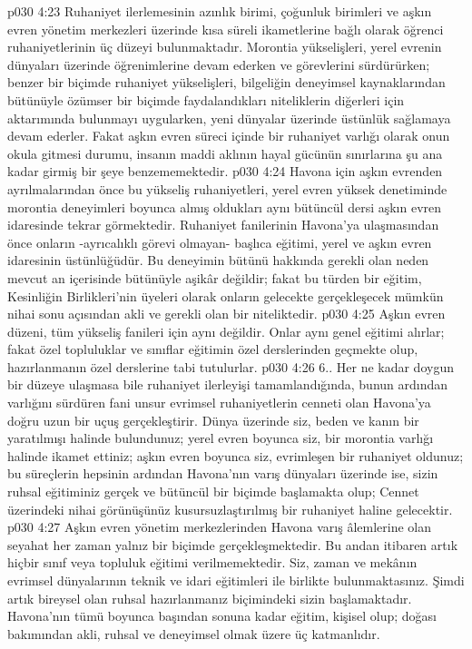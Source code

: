 \vs p030 4:23 Ruhaniyet ilerlemesinin azınlık birimi, çoğunluk birimleri ve aşkın evren yönetim merkezleri üzerinde kısa süreli ikametlerine bağlı olarak öğrenci ruhaniyetlerinin üç düzeyi bulunmaktadır. Morontia yükselişleri, yerel evrenin dünyaları üzerinde öğrenimlerine devam ederken ve görevlerini sürdürürken; benzer bir biçimde ruhaniyet yükselişleri, bilgeliğin deneyimsel kaynaklarından bütünüyle özümser bir biçimde faydalandıkları niteliklerin diğerleri için aktarımında bulunmayı uygularken, yeni dünyalar üzerinde üstünlük sağlamaya devam ederler. Fakat aşkın evren süreci içinde bir ruhaniyet varlığı olarak onun okula gitmesi durumu, insanın maddi aklının hayal gücünün sınırlarına şu ana kadar girmiş bir şeye benzememektedir.
\vs p030 4:24 Havona için aşkın evrenden ayrılmalarından önce bu yükseliş ruhaniyetleri, yerel evren yüksek denetiminde morontia deneyimleri boyunca almış oldukları aynı bütüncül dersi aşkın evren idaresinde tekrar görmektedir. Ruhaniyet fanilerinin Havona’ya ulaşmasından önce onların \hyp{}ayrıcalıklı görevi olmayan\hyp{} başlıca eğitimi, yerel ve aşkın evren idaresinin üstünlüğüdür. Bu deneyimin bütünü hakkında gerekli olan neden mevcut an içerisinde bütünüyle aşikâr değildir; fakat bu türden bir eğitim, Kesinliğin Birlikleri’nin üyeleri olarak onların gelecekte gerçekleşecek mümkün nihai sonu açısından akli ve gerekli olan bir niteliktedir.
\vs p030 4:25 Aşkın evren düzeni, tüm yükseliş fanileri için aynı değildir. Onlar aynı genel eğitimi alırlar; fakat özel topluluklar ve sınıflar eğitimin özel derslerinden geçmekte olup, hazırlanmanın özel derslerine tabi tutulurlar.
\vs p030 4:26 6.\bibnobreakspace {}. Her ne kadar doygun bir düzeye ulaşmasa bile ruhaniyet ilerleyişi tamamlandığında, bunun ardından varlığını sürdüren fani unsur evrimsel ruhaniyetlerin cenneti olan Havona’ya doğru uzun bir uçuş gerçekleştirir. Dünya üzerinde siz, beden ve kanın bir yaratılmışı halinde bulundunuz; yerel evren boyunca siz, bir morontia varlığı halinde ikamet ettiniz; aşkın evren boyunca siz, evrimleşen bir ruhaniyet oldunuz; bu süreçlerin hepsinin ardından Havona’nın varış dünyaları üzerinde ise, sizin ruhsal eğitiminiz gerçek ve bütüncül bir biçimde başlamakta olup; Cennet üzerindeki nihai görünüşünüz kusursuzlaştırılmış bir ruhaniyet haline gelecektir.
\vs p030 4:27 Aşkın evren yönetim merkezlerinden Havona varış âlemlerine olan seyahat her zaman yalnız bir biçimde gerçekleşmektedir. Bu andan itibaren artık hiçbir sınıf veya topluluk eğitimi verilmemektedir. Siz, zaman ve mekânın evrimsel dünyalarının teknik ve idari eğitimleri ile birlikte bulunmaktasınız. Şimdi artık bireysel olan ruhsal hazırlanmanız biçimindeki sizin  başlamaktadır. Havona’nın tümü boyunca başından sonuna kadar eğitim, kişisel olup; doğası bakımından akli, ruhsal ve deneyimsel olmak üzere üç katmanlıdır.
